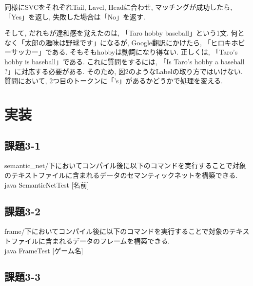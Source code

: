 \documentclass[uplatex,12pt]{jsarticle}
\begin{document}
 同様にSVCをそれぞれTail, Lavel, Headに合わせ, マッチングが成功したら, 「Yes」を返し, 失敗した場合は「No」を返す.

そして, だれもが違和感を覚えたのは, 「Taro hobby baseball」という1文. 何となく「太郎の趣味は野球です」になるが, Google翻訳にかけたら, 「ヒロキホビーサッカー」である. そもそもhobbyは動詞になり得ない. 正しくは, 「Taro's hobby is baseball」である. これに質問をするには, 「Is Taro's hobby a baseball ?」に対応する必要がある. そのため, 図2のようなLabelの取り方ではいけない. 質問において, 2つ目のトークンに「's」があるかどうかで処理を変える.

\section{実装}
\subsection{課題3-1}
semantic\_net/下においてコンパイル後に以下のコマンドを実行することで対象のテキストファイルに含まれるデータのセマンティックネットを構築できる. \\
java SemanticNetTest [名前] 
\subsection{課題3-2}
frame/下においてコンパイル後に以下のコマンドを実行することで対象のテキストファイルに含まれるデータのフレームを構築できる. \\
java FrameTest [ゲーム名] 

\subsection{課題3-3}
\end{document}
